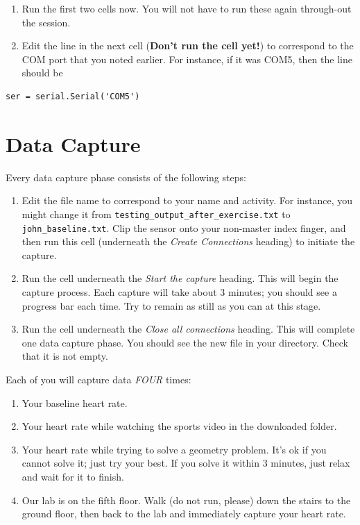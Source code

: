 \documentclass[11pt]{article}
\providecommand{\tightlist}{%
  \setlength{\itemsep}{0pt}\setlength{\parskip}{0pt}}
\begin{document}
\begin{enumerate}
\def\labelenumi{\arabic{enumi}.}
\setcounter{enumi}{4}
\tightlist
\item
  Run the first two cells now. You will not have to run these again
  through-out the session.
\item
  Edit the line in the next cell (\textbf{Don't run the cell yet!}) to
  correspond to the COM port that you noted earlier. For instance, if it
  was COM5, then the line should be
\end{enumerate}

\begin{verbatim}
ser = serial.Serial('COM5')
\end{verbatim}

\hypertarget{data-capture}{%
\section{Data Capture}\label{data-capture}}

Every data capture phase consists of the following steps:

\begin{enumerate}
\def\labelenumi{\arabic{enumi}.}
\tightlist
\item
  Edit the file name to correspond to your name and activity. For
  instance, you might change it from
  \texttt{testing\_output\_after\_exercise.txt} to
  \texttt{john\_baseline.txt}. Clip the sensor onto your non-master
  index finger, and then run this cell (underneath the \emph{Create
  Connections} heading) to initiate the capture.
\item
  Run the cell underneath the \emph{Start the capture} heading. This
  will begin the capture process. Each capture will take about 3
  minutes; you should see a progress bar each time. Try to remain as
  still as you can at this stage.
\item
  Run the cell underneath the \emph{Close all connections} heading. This
  will complete one data capture phase. You should see the new file in
  your directory. Check that it is not empty.
\end{enumerate}

Each of you will capture data \emph{FOUR} times:

\begin{enumerate}
\def\labelenumi{\arabic{enumi}.}
\tightlist
\item
  Your baseline heart rate.
\item
  Your heart rate while watching the sports video in the downloaded
  folder.
\item
  Your heart rate while trying to solve a geometry problem. It's ok if
  you cannot solve it; just try your best. If you solve it within 3
  minutes, just relax and wait for it to finish.
\item
  Our lab is on the fifth floor. Walk (do not run, please) down the
  stairs to the ground floor, then back to the lab and immediately
  capture your heart rate.
\end{enumerate}
\end{document}
